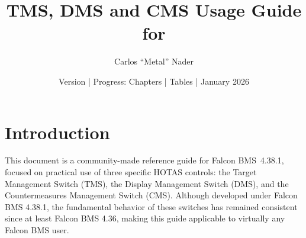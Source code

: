 \documentclass[11pt, a4paper, twoside]{report}
\title{TMS, DMS and CMS Usage Guide for \bmsver}
\author{Carlos ``Metal'' Nader}
\date{Version \fulldocversion{} | Progress: Chapters \chapterscompletedof{} | Tables \tablesfilledpct{} | January 2026}
\providecommand{\bmsver}{Falcon BMS~4.38.1}
\begin{document}
\maketitle


\setcounter{tocdepth}{3}       %
\setcounter{secnumdepth}{3}    %

\newpage
\tableofcontents
\newpage
{}

\chapter{Introduction}
\label{chap:C1}

This document is a community-made reference guide for \bmsver, focused on practical use of three specific HOTAS controls: the Target Management Switch (TMS), the Display Management Switch (DMS), and the Countermeasures Management Switch (CMS). Although developed under Falcon BMS 4.38.1, the fundamental behavior of these switches has remained consistent since at least Falcon BMS 4.36, making this guide applicable to virtually any Falcon BMS user.
\end{document}
